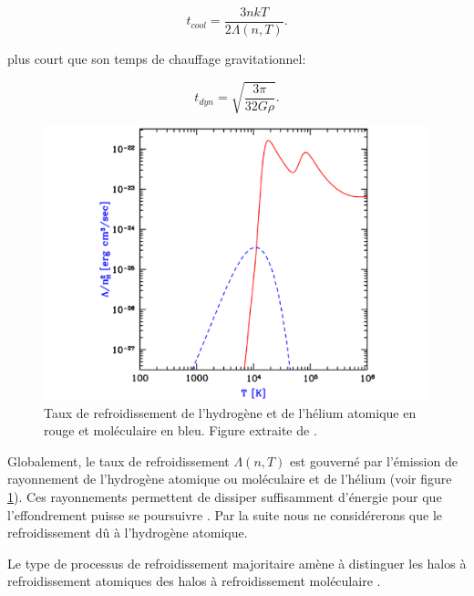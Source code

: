 \begin{equation}
t_{cool} = \frac{3 nkT}{2 \Lambda(n,T)}.
\end{equation}

plus court que son temps de chauffage gravitationnel:

\begin{equation}
t_{dyn} =\sqrt{\frac{3 \pi}{32 G \rho}}.
\end{equation}




\begin{figure}
        \includegraphics[width=.95\linewidth]{img/01/fonction_refroidissement.pdf} 
        \caption[Fonction de refroidissement]{Taux de refroidissement de l'hydrogène et de l'hélium atomique en rouge et moléculaire en bleu. 
        Figure extraite de \cite{2016PhR...645....1B}.
 		\label{fig:refroidissement}}
\end{figure}

Globalement, le taux de refroidissement $\Lambda(n,T)$ est gouverné par l'émission de rayonnement de l'hydrogène atomique ou moléculaire et de l’hélium (voir figure \ref{fig:refroidissement}).
Ces rayonnements permettent de dissiper suffisamment d'énergie pour que l'effondrement puisse se poursuivre \citep{2001PhR...349..125B}.
Par la suite nous ne considérerons que le refroidissement dû à l'hydrogène atomique.

Le type de processus de refroidissement majoritaire amène à distinguer les halos à refroidissement atomiques des halos à refroidissement moléculaire \citep{2002Sci...295...93A}.

